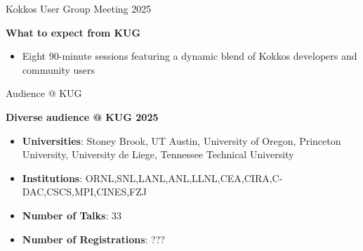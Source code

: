 
\begin{frame}[fragile]{Kokkos User Group Meeting 2025}
\begin{center}
\textbf{What to expect from KUG}
\end{center}

\begin{itemize}
  \item{Eight 90-minute sessions featuring a dynamic blend of Kokkos developers and community users}

\end{itemize}
\end{frame}

\begin{frame}[fragile]{Audience @ KUG}
\begin{center}
\textbf{Diverse audience @ KUG 2025}
\vspace{0.5cm}

  \begin{itemize}
    \item{\textbf{Universities}: Stoney Brook, UT Austin, University of Oregon, Princeton University, University de Liege, Tennessee Technical University}
    \item{\textbf{Institutions}: ORNL,SNL,LANL,ANL,LLNL,CEA,CIRA,C-DAC,CSCS,MPI,CINES,FZJ}
    \item{\textbf{Number of Talks}: 33}
    \item{\textbf{Number of Registrations}: ???}

  \end{itemize}
\end{center}
\end{frame}
